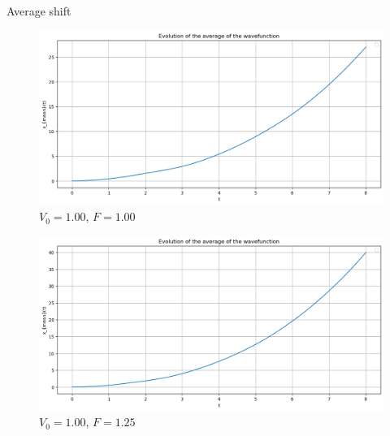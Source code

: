 \begin{frame}{Average shift}
    \vfill

    \begin{minipage}[c]{0.45\textwidth}
        \begin{figure}
            \centering
            \includegraphics[width=\textwidth]{Immagini/plot-moving-average-1.png}
            \caption*{$V_0=1.00$, $F=1.00$}
        \end{figure}
    \end{minipage}
    \hfill
    \begin{minipage}[c]{0.45\textwidth}
        \begin{figure}
            \centering
            \includegraphics[width=\textwidth]{Immagini/plot-moving-average-1,25.png}
            \caption*{$V_0=1.00$, $F=1.25$}
        \end{figure}
    \end{minipage}

    \vfill


\end{frame}
